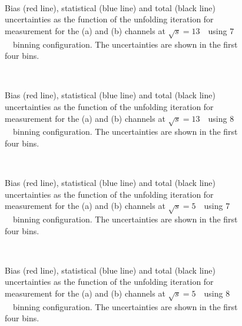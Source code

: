 \begin{figure}[h]
\centering
{}
\\
\caption{Bias (red line), statistical (blue line) and total (black line) uncertainties as the function of the unfolding iteration for \ut measurement for the \Zee (a) and \Zmm (b) channels at $\sqrt{s} = 13$~\TeV\ using $7$~\GeV\ binning configuration. The uncertainties are shown in the first four bins.}
\label{fig:biasunc_min_uT7GeV_13}
\end{figure}
\begin{figure}[h]
\centering
{}
\\
\caption{Bias (red line), statistical (blue line) and total (black line) uncertainties as the function of the unfolding iteration for \ut measurement for the \Zee (a) and \Zmm (b) channels at $\sqrt{s} = 13$~\TeV\ using $8$~\GeV\ binning configuration. The uncertainties are shown in the first four bins.}
\label{fig:biasunc_min_uT8GeV_13}
\end{figure}
\begin{figure}[h]
\centering
{}
\\
\caption{Bias (red line), statistical (blue line) and total (black line) uncertainties as the function of the unfolding iteration for \ut measurement for the \Zee (a) and \Zmm (b) channels at $\sqrt{s} = 5$~\TeV\ using $7$~\GeV\ binning configuration. The uncertainties are shown in the first four bins.}
\label{fig:biasunc_min_uT7GeV_5}
\end{figure}
\begin{figure}[h]
\centering
{}
\\
\caption{Bias (red line), statistical (blue line) and total (black line) uncertainties as the function of the unfolding iteration for \ut measurement for the \Zee (a) and \Zmm (b) channels at $\sqrt{s} = 5$~\TeV\ using $8$~\GeV\ binning configuration. The uncertainties are shown in the first four bins.}
\label{fig:biasunc_min_uT8GeV_5}
\end{figure}


